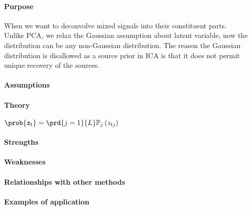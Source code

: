 \paragraph{Purpose}
When we want to deconvolve mixed signals into their constituent parts.\\
Unlike PCA, we relax the Gaussian assumption about latent variable, now the 
distribution can be any non-Gaussian distribution.
The reason the Gaussian distribution is disallowed as a source prior in ICA is that 
it does not permit unique recovery of the sources.

\paragraph{Assumptions}
\paragraph{Theory}
$\prob{\bm{z}_{t}} = \prd{j=1}{L}\mathbb{P}_{j}\left(z_{tj}\right)$
\paragraph{Strengths}
\paragraph{Weaknesses}
\paragraph{Relationships with other methods}
\paragraph{Examples of application}

